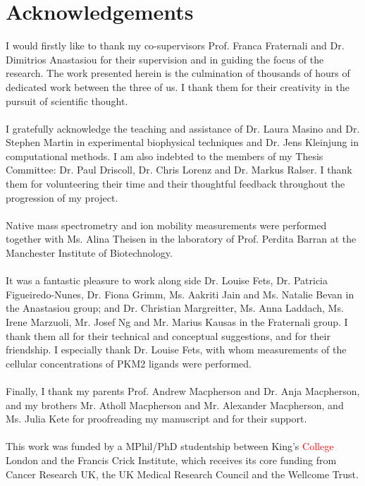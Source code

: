 \section*{Acknowledgements}
I would firstly like to thank my co-supervisors Prof. Franca Fraternali and Dr. Dimitrios Anastasiou for their supervision and in guiding the focus of the research. The work presented herein is the culmination of thousands of hours of dedicated work between the three of us. I thank them for their creativity in the pursuit of scientific thought. 
%
%
\\\\
%
%
I gratefully acknowledge the teaching and assistance of Dr. Laura Masino and Dr. Stephen Martin in experimental biophysical techniques and Dr. Jens Kleinjung in computational methods. I am also indebted to the members of my Thesis Committee: Dr. Paul Driscoll, Dr. Chris Lorenz and Dr. Markus Ralser. I thank them for volunteering their time and their thoughtful feedback throughout the progression of my project.
%
%
\\\\
%
%
Native mass spectrometry and ion mobility measurements were performed together with Ms. Alina Theisen in the laboratory of Prof. Perdita Barran at the Manchester Institute of Biotechnology. 
%
%
\\\\
%
%
It was a fantastic pleasure to work along side Dr. Louise Fets, Dr. Patricia Figueiredo-Nunes, Dr. Fiona Grimm, Ms. Aakriti Jain and Ms. Natalie Bevan in the Anastasiou group; and Dr. Christian Margreitter, Ms. Anna Laddach, Ms. Irene Marzuoli, Mr. Josef Ng and Mr. Marius Kausas in the Fraternali group. I thank them all for their technical and conceptual suggestions, and for their friendship. I especially thank Dr. Louise Fets, with whom measurements of the cellular concentrations of PKM2 ligands were performed.
%
%
\\\\
%
%
Finally, I thank my parents Prof. Andrew Macpherson and Dr. Anja Macpherson, and my brothers Mr. Atholl Macpherson and Mr. Alexander Macpherson, and Ms. Julia Kete for proofreading my manuscript and for their support.
%
%
\\\\
%
%
This work was funded by a MPhil/PhD studentship between King's \textcolor{red}{College} London and the Francis Crick Institute, which receives its core funding from Cancer Research UK, the UK Medical Research Council and the Wellcome Trust.
